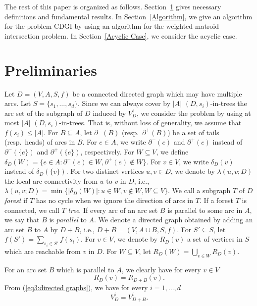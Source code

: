 \documentclass[11pt]{article}
\newcounter{ni}
\theoremstyle{plain}
\begin{document}
The rest of this paper is organized as follows. 
Section~\ref{Preliminaries} gives necessary definitions and fundamental results. 
In Section~\ref{Algorithm}, we give an algorithm for the problem 
$\mbox{CDGI}$ by using an algorithm for the weighted matroid intersection 
problem. In Section~\ref{Acyclic Case}, we consider the acyclic case. 

\section{Preliminaries}
\label{Preliminaries}

Let $D=(V,A,S,f)$ be a connected directed graph which may have multiple arcs. 
Let $S=\{s_1,\ldots,s_d\}$. 
Since we can always cover by
$|A|$ $(D,s_i)$-in-trees the arc set of the subgraph
of $D$ induced by $V^i_D$, 
we consider the problem by using at most
$|A|$ $(D,s_i)$-in-trees. That is,
without loss of generality, we assume that $f(s_i) \le |A|$.
For $B \subseteq A$, let $\partial^-(B)$ (resp.~$\partial^+(B)$) be a set of tails (resp.~heads) of arcs in $B$. 
For $e \in A$, we write $\partial^-(e)$ and $\partial^+(e)$ instead of $\partial^-(\{e\})$ and $\partial^+(\{e\})$, 
respectively. 
For $W \subseteq V$,
we define $\delta_D(W)=\{e\in A \colon \partial^-(e) \in W, \partial^+(e) \notin W\}$.
For $v \in V$, we write $\delta_D(v)$ instead of $\delta_D(\{v\})$. 
For two distinct vertices $u, v \in D$, we denote by $\lambda(u,v;D)$ the 
local arc connectivity from $u$ to $v$ in $D$, i.e.,
$\lambda(u,v;D)
= \min\{|\delta_D(W)|\colon u \in W, v \notin W, W \subseteq V\}$. 
We call a subgraph $T$ of $D$ {\it forest} if 
$T$ has no cycle when we ignore the direction of arcs in $T$. 
If a forest $T$ is connected, we call $T$ {\it tree}.  
If every arc of an arc set $B$ is parallel to some arc in $A$, 
we say that $B$ is {\it parallel} to $A$. 
We denote a directed graph obtained by adding an arc set $B$ to $A$ by $D+B$, 
i.e., $D+B=(V,A\cup B,S,f)$. 
For $S'\subseteq S$, let $f(S')=\sum_{s_i \in
S'}f(s_i)$. 
For $v \in V$, we denote by $R_D(v)$ a set of vertices in
$S$ which are reachable from $v$ in $D$. 
For $W \subseteq V$,
let $R_D(W)=\bigcup_{v \in W}R_D(v)$.

For an arc set $B$ which is parallel to $A$, we clearly have
for every $v \in V$ 
\begin{equation} \label{eq3:directed graphs}
R_D(v)=R_{D+B}(v). 
\end{equation}
From (\ref{eq3:directed graphs}), we have
for every $i=1,\ldots,d$
\begin{equation} \label{eq4:directed graphs}
V^i_D=V^i_{D+B}.
\end{equation}
\end{document}
